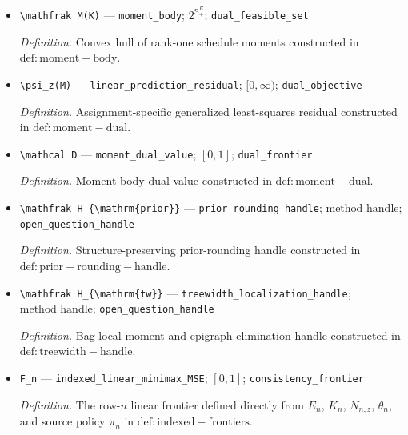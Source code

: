 \documentclass{article}
\begin{document}
\begin{itemize}
  \par\smallskip\noindent\emph{Definition.} The row-\(n\) moment-body dual value constructed in \(\mathrm{def:moment-dual}\).
  \item \texttt{\textbackslash{}\allowbreak{}mathfrak M(K)} --- \texttt{moment\_\allowbreak{}body}; \(2^{\mathbb S_+^E}\); \texttt{dual\_\allowbreak{}feasible\_\allowbreak{}set}
  \par\smallskip\noindent\emph{Definition.} Convex hull of rank-one schedule moments constructed in \(\mathrm{def:moment-body}\).
  \item \texttt{\textbackslash{}\allowbreak{}psi\_\allowbreak{}z(M)} --- \texttt{linear\_\allowbreak{}prediction\_\allowbreak{}residual}; \([0,\infty)\); \texttt{dual\_\allowbreak{}objective}
  \par\smallskip\noindent\emph{Definition.} Assignment-specific generalized least-squares residual constructed in \(\mathrm{def:moment-dual}\).
  \item \texttt{\textbackslash{}\allowbreak{}mathcal D} --- \texttt{moment\_\allowbreak{}dual\_\allowbreak{}value}; \([0,1]\); \texttt{dual\_\allowbreak{}frontier}
  \par\smallskip\noindent\emph{Definition.} Moment-body dual value constructed in \(\mathrm{def:moment-dual}\).
  \item \texttt{\textbackslash{}\allowbreak{}mathfrak H\_\allowbreak{}\{\textbackslash{}\allowbreak{}mathrm\{prior\}\allowbreak{}\}\allowbreak{}} --- \texttt{prior\_\allowbreak{}rounding\_\allowbreak{}handle}; \(\text{method handle}\); \texttt{open\_\allowbreak{}question\_\allowbreak{}handle}
  \par\smallskip\noindent\emph{Definition.} Structure-preserving prior-rounding handle constructed in \(\mathrm{def:prior-rounding-handle}\).
  \item \texttt{\textbackslash{}\allowbreak{}mathfrak H\_\allowbreak{}\{\textbackslash{}\allowbreak{}mathrm\{tw\}\allowbreak{}\}\allowbreak{}} --- \texttt{treewidth\_\allowbreak{}localization\_\allowbreak{}handle}; \(\text{method handle}\); \texttt{open\_\allowbreak{}question\_\allowbreak{}handle}
  \par\smallskip\noindent\emph{Definition.} Bag-local moment and epigraph elimination handle constructed in \(\mathrm{def:treewidth-handle}\).
  \item \texttt{F\_\allowbreak{}n} --- \texttt{indexed\_\allowbreak{}linear\_\allowbreak{}minimax\_\allowbreak{}MSE}; \([0,1]\); \texttt{consistency\_\allowbreak{}frontier}
  \par\smallskip\noindent\emph{Definition.} The row-\(n\) linear frontier defined directly from \(E_n\), \(K_n\), \(N_{n,z}\), \(\theta_n\), and source policy \(\pi_n\) in \(\mathrm{def:indexed-frontiers}\).

\end{itemize}
\end{document}
